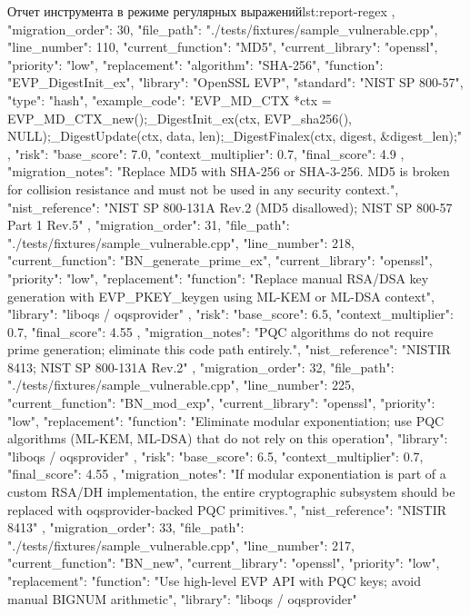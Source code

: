 \documentclass{itmo-vkr}
\begin{document}
\begin{itmolisting}[JSON]{Отчет инструмента в режиме регулярных выражений}{lst:report-regex}
{{		},
		{
			"migration_order": 30,
			"file_path": "./tests/fixtures/sample_vulnerable.cpp",
			"line_number": 110,
			"current_function": "MD5",
			"current_library": "openssl",
			"priority": "low",
			"replacement": {
				"algorithm": "SHA-256",
				"function": "EVP_DigestInit_ex",
				"library": "OpenSSL EVP",
				"standard": "NIST SP 800-57",
				"type": "hash",
				"example_code": "EVP_MD_CTX *ctx = EVP_MD_CTX_new();\nEVP_DigestInit_ex(ctx, EVP_sha256(), NULL);\nEVP_DigestUpdate(ctx, data, len);\nEVP_DigestFinalex(ctx, digest, &digest_len);"
			},
			"risk": {
				"base_score": 7.0,
				"context_multiplier": 0.7,
				"final_score": 4.9
			},
			"migration_notes": "Replace MD5 with SHA-256 or SHA-3-256. MD5 is broken for collision resistance and must not be used in any security context.",
			"nist_reference": "NIST SP 800-131A Rev.2 (MD5 disallowed); NIST SP 800-57 Part 1 Rev.5"
		},
		{
			"migration_order": 31,
			"file_path": "./tests/fixtures/sample_vulnerable.cpp",
			"line_number": 218,
			"current_function": "BN_generate_prime_ex",
			"current_library": "openssl",
			"priority": "low",
			"replacement": {
				"function": "Replace manual RSA/DSA key generation with EVP_PKEY_keygen using ML-KEM or ML-DSA context",
				"library": "liboqs / oqsprovider"
			},
			"risk": {
				"base_score": 6.5,
				"context_multiplier": 0.7,
				"final_score": 4.55
			},
			"migration_notes": "PQC algorithms do not require prime generation; eliminate this code path entirely.",
			"nist_reference": "NISTIR 8413; NIST SP 800-131A Rev.2"
		},
		{
			"migration_order": 32,
			"file_path": "./tests/fixtures/sample_vulnerable.cpp",
			"line_number": 225,
			"current_function": "BN_mod_exp",
			"current_library": "openssl",
			"priority": "low",
			"replacement": {
				"function": "Eliminate modular exponentiation; use PQC algorithms (ML-KEM, ML-DSA) that do not rely on this operation",
				"library": "liboqs / oqsprovider"
			},
			"risk": {
				"base_score": 6.5,
				"context_multiplier": 0.7,
				"final_score": 4.55
			},
			"migration_notes": "If modular exponentiation is part of a custom RSA/DH implementation, the entire cryptographic subsystem should be replaced with oqsprovider-backed PQC primitives.",
			"nist_reference": "NISTIR 8413"
		},
		{
			"migration_order": 33,
			"file_path": "./tests/fixtures/sample_vulnerable.cpp",
			"line_number": 217,
			"current_function": "BN_new",
			"current_library": "openssl",
			"priority": "low",
			"replacement": {
				"function": "Use high-level EVP API with PQC keys; avoid manual BIGNUM arithmetic",
				"library": "liboqs / oqsprovider"
}}}
\end{itmolisting}
\end{document}

